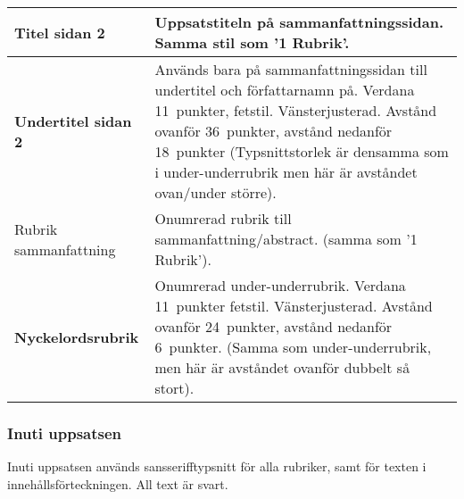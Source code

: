 \begin{longtable}{| p{} | p{} |}
  \hline
  {\sffamily\raggedright\Large{}Titel sidan 2} &
  Uppsatstiteln på sammanfattningssidan. Samma stil som '1 Rubrik'.
  \\\hline
  {\sffamily\bfseries{}Undertitel sidan 2} &
  Används bara på sammanfattningssidan till undertitel och författarnamn på.
  Verdana 11~punkter, fetstil. Vänsterjusterad.
  Avstånd ovanför 36~punkter, avstånd nedanför 18~punkter (Typsnittstorlek är
  densamma som i under-underrubrik men här är avståndet ovan/under större).
  \\\hline
  {\sffamily\Large\raggedright{}Rubrik sammanfattning} &
  Onumrerad rubrik till sammanfattning/abstract.
  (samma som '1 Rubrik').
  \\\hline
  {\sffamily\bfseries{}Nyckelordsrubrik} &
  Onumrerad under-underrubrik. Verdana 11~punkter fetstil. Vänsterjusterad.
  Avstånd ovanför 24~punkter, avstånd nedanför 6~punkter. (Samma som
  under-underrubrik, men här är avståndet ovanför dubbelt så stort).
  \\\hline
\end{longtable}


\subsubsection{Inuti uppsatsen}

Inuti uppsatsen används sansserifftypsnitt för alla rubriker, samt för texten i
innehållsförteckningen. All text är svart.

